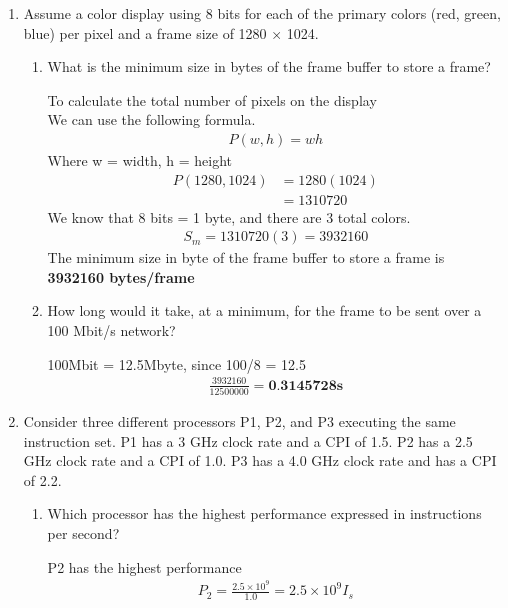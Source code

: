 \documentclass[10pt]{article}
\begin{document}
\begin{enumerate}
    \item Assume a color display using 8 bits for each of the primary colors (red, green, blue) per pixel and a frame size of 1280 × 1024.
    \begin{enumerate}
        \item What is the minimum size in bytes of the frame buffer to store a frame?
        \begin{center}
             To calculate the total number of pixels on the display\\
             We can use the following formula.
             \begin{align*}
                P(w, h) = wh
            \end{align*}
            Where w = width, h = height \\
            \begin{align*}
                P(1280, 1024) & = 1280(1024) \\
                              & = 1310720
            \end{align*}
            We know that 8 bits = 1 byte, and there are 3 total colors.
            \begin{align*}
                S_m = 1310720(3) = 3932160
            \end{align*}
            The minimum size in byte of the frame buffer to store a frame is\\
            \textbf{3932160 bytes/frame}
        \end{center}
        
        \item How long would it take, at a minimum, for the frame to be sent over a 100 Mbit/s network?
        \begin{center}
            100Mbit = 12.5Mbyte, since 100/8 = 12.5
            \begin{align*}
                \frac{3932160}{12500000} = \textbf{0.3145728s}
            \end{align*}
        \end{center}
    \end{enumerate}
    \item 
    Consider three different processors P1, P2, and P3 executing the same instruction set. P1 has a 3 GHz clock rate and a CPI of 1.5. P2 has a 2.5 GHz clock rate and a CPI of 1.0. P3 has a 4.0 GHz clock rate and has a CPI of 2.2.
    
    \begin{enumerate}
        \item Which processor has the highest performance expressed in instructions per second?
        \begin{center}
            P2 has the highest performance
            \begin{align*}
                P_2 = \frac{2.5 \times 10^9}{1.0} = 2.5 \times 10^9I_s
            \end{align*}


\end{center}
\end{enumerate}
\end{enumerate}
\end{document}
